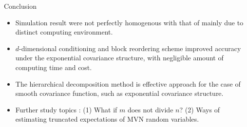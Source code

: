 
\begin{frame}{Conclusion}

    \begin{itemize}
        \item Simulation result were not perfectly homogenous with that of \citet{cao2019hierarchical} mainly due to distinct computing environment.\\
        \item $d$-dimensional conditioning and block reordering scheme improved accuracy under the exponential covariance structure, with negligible amount of computing time and cost.\\
        \item The hierarchical decomposition method is effective approach for the case of smooth covariance function, such as exponential covariance structure.\\
        \item Further study topics : (1) What if $m$ does not divide $n$? (2) Ways of estimating truncated expectations of MVN random variables.\\
    \end{itemize}
    
\end{frame}

